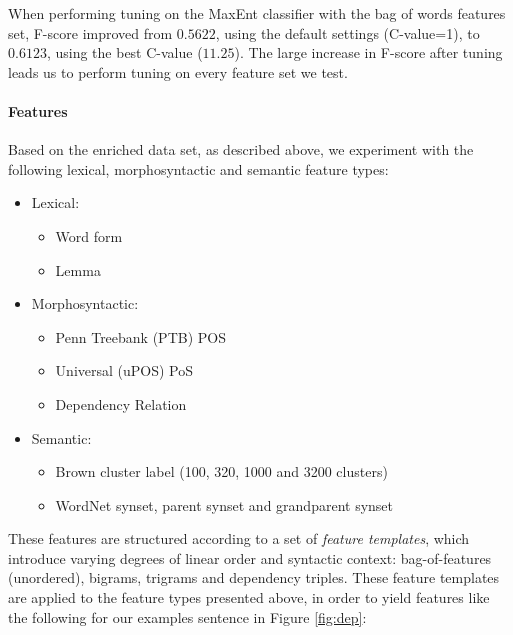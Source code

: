 \documentclass[11pt,letterpaper]{article}
\begin{document}
When performing tuning on the MaxEnt classifier with the bag of words features set, F-score improved from $0.5622$, using the default settings (C-value=1), to $0.6123$, using the best C-value ($11.25$). The large increase in F-score after tuning leads us to perform tuning on every feature set we test.

\paragraph{Features}
Based on the enriched data set, as described above, we experiment with the following lexical, morphosyntactic and semantic feature types:

\begin{itemize}[noitemsep]
\item Lexical:
  \begin{itemize}[noitemsep]
  \item Word form
  \item Lemma
  \end{itemize}
  
\item Morphosyntactic:
  \begin{itemize}[noitemsep]
  \item Penn Treebank (PTB) POS
  \item Universal (uPOS) PoS
  \item Dependency Relation
  \end{itemize}
  
\item Semantic:
  \begin{itemize}[noitemsep]
    \item Brown cluster label (100, 320, 1000 and 3200 clusters)
    \item WordNet synset, parent synset and grandparent synset
  \end{itemize}
\end{itemize}


These features are structured according to a set of \emph{feature
  templates}, which introduce varying degrees of linear order and
syntactic context: bag-of-features (unordered), bigrams, trigrams and
dependency triples. These feature templates are applied to the feature
types presented above, in order to yield features like the following
for our examples sentence in Figure \ref{fig:dep}:
\end{document}
